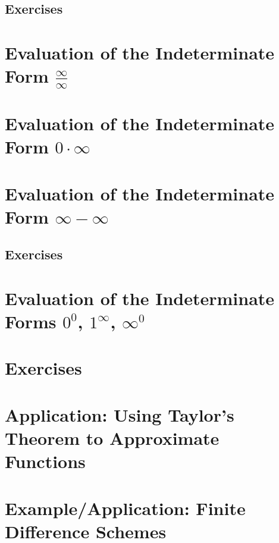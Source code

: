 \subsection{Exercises}
\label{subsec:13:09:02}

\section{Evaluation of the Indeterminate Form $\frac{\infty}{\infty}$}
\label{sec:13:10}

\section{Evaluation of the Indeterminate Form $0 \cdot \infty$}
\label{sec:13:11}

\section{Evaluation of the Indeterminate Form $\infty - \infty$}
\label{sec:13:12}

\subsection{Exercises}
\label{sec:13:12:01}

\section{Evaluation of the Indeterminate Forms $0^0$, $1^\infty$, $\infty^0$}
\label{sec:13:13}

\section{Exercises}
\label{sec:13:14}

\section{Application: Using Taylor's Theorem to Approximate Functions}
\label{sec:13:15}

\section{Example/Application: Finite Difference Schemes}
\label{sec:13:16}
